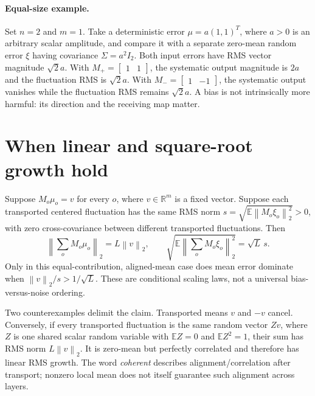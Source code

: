 \documentclass[10pt,a4paper]{article}
\newcommand{\R}{\mathbb{R}}
\newcommand{\E}{\mathbb{E}}
\newcommand{\norm}[1]{\left\lVert#1\right\rVert}
\begin{document}
\paragraph{Equal-size example.}
Set $n=2$ and $m=1$. Take a deterministic error $\mu=a(1,1)^T$, where $a>0$
is an arbitrary scalar amplitude, and compare it with a separate zero-mean
random error $\xi$ having covariance $\Sigma=a^2I_2$.
Both input errors have RMS vector magnitude
$\sqrt2a$. With $M_+=\begin{bmatrix}1&1\end{bmatrix}$, the systematic output
magnitude is $2a$ and the fluctuation RMS is $\sqrt2a$. With
$M_-=\begin{bmatrix}1&-1\end{bmatrix}$, the systematic output vanishes while
the fluctuation RMS remains $\sqrt2a$. A bias is not intrinsically more harmful:
its direction and the receiving map matter.

\section{When linear and square-root growth hold}
Suppose $M_o\mu_o=v$ for every $o$, where $v\in\R^m$ is a fixed vector.
Suppose each transported centered fluctuation has the same RMS norm
$s=\sqrt{\E\norm{M_o\xi_o}_2^2}>0$, with zero cross-covariance between
different transported fluctuations. Then
\begin{equation}
 \left\lVert\sum_oM_o\mu_o\right\rVert_2=L\norm{v}_2,
 \qquad
 \sqrt{\E\left\lVert\sum_oM_o\xi_o\right\rVert_2^2}=\sqrt L\,s.
 \label{sr:depth}
\end{equation}
Only in this equal-contribution, aligned-mean case does mean error dominate
when $\norm{v}_2/s>1/\sqrt L$. These are conditional scaling laws, not a
universal bias-versus-noise ordering.

Two counterexamples delimit the claim. Transported means $v$ and $-v$ cancel.
Conversely, if every transported fluctuation is the same random vector $Zv$,
where $Z$ is one shared scalar random variable with $\E Z=0$ and $\E Z^2=1$,
their sum has RMS norm $L\norm{v}_2$.
It is zero-mean but perfectly correlated and therefore has linear RMS growth.
The word \emph{coherent} describes alignment/correlation after transport;
nonzero local mean does not itself guarantee such alignment across layers.
\end{document}
